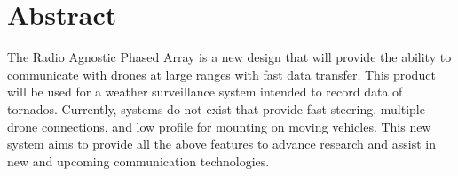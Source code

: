 \documentclass[UROP.tex]{subfiles}
\begin{document}
\bigskip
\section*{\Large Abstract}
	The Radio Agnostic Phased Array is a new design that will provide the ability to communicate with drones at large ranges with fast data transfer.  This product will be used for a weather surveillance system intended to record data of tornados.  Currently, systems do not exist that provide fast steering, multiple drone connections, and low profile for mounting on moving vehicles.  This new system aims to provide all the above features to advance research and assist in new and upcoming communication technologies.
\end{document}
